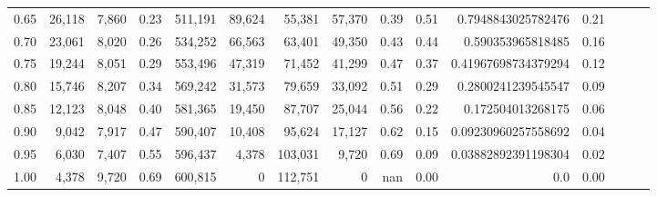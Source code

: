 \begin{tabular}{rrrrrrrrrrrrrrr}
0.65 &  26,118 &  7,860 &  0.23 &  511,191 &   89,624 &   55,381 &   57,370 &  0.39 &  0.51 &   0.7948843025782476 &      0.21 \\
0.70 &  23,061 &  8,020 &  0.26 &  534,252 &   66,563 &   63,401 &   49,350 &  0.43 &  0.44 &    0.590353965818485 &      0.16 \\
0.75 &  19,244 &  8,051 &  0.29 &  553,496 &   47,319 &   71,452 &   41,299 &  0.47 &  0.37 &  0.41967698734379294 &      0.12 \\
0.80 &  15,746 &  8,207 &  0.34 &  569,242 &   31,573 &   79,659 &   33,092 &  0.51 &  0.29 &   0.2800241239545547 &      0.09 \\
0.85 &  12,123 &  8,048 &  0.40 &  581,365 &   19,450 &   87,707 &   25,044 &  0.56 &  0.22 &    0.172504013268175 &      0.06 \\
0.90 &   9,042 &  7,917 &  0.47 &  590,407 &   10,408 &   95,624 &   17,127 &  0.62 &  0.15 &  0.09230960257558692 &      0.04 \\
0.95 &   6,030 &  7,407 &  0.55 &  596,437 &    4,378 &  103,031 &    9,720 &  0.69 &  0.09 &  0.03882892391198304 &      0.02 \\
1.00 &   4,378 &  9,720 &  0.69 &  600,815 &        0 &  112,751 &        0 &   nan &  0.00 &                  0.0 &      0.00 \\
\bottomrule
\end{tabular}
